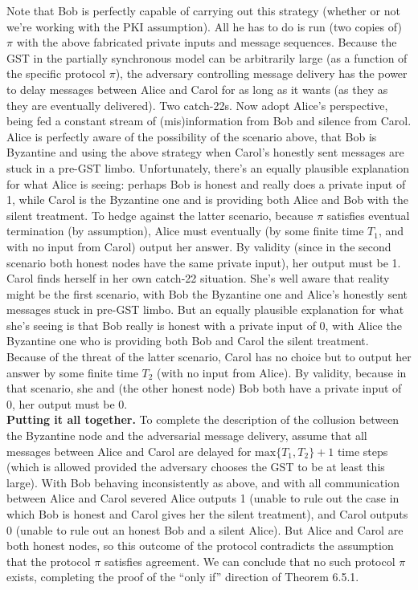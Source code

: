 Note that Bob is perfectly capable of carrying out this strategy (whether or not we’re working
with the PKI assumption). All he has to do is run (two copies of) $\pi$ with the above fabricated
private inputs and message sequences. Because the GST in the partially synchronous model
can be arbitrarily large (as a function of the specific protocol $\pi$), the adversary controlling
message delivery has the power to delay messages between Alice and Carol for as long as it
wants (as they as they are eventually delivered).
Two catch-22s. Now adopt Alice’s perspective, being fed a constant stream of (mis)information
from Bob and silence from Carol. Alice is perfectly aware of the possibility of the scenario
above, that Bob is Byzantine and using the above strategy when Carol’s honestly sent messages are stuck in a pre-GST limbo. Unfortunately, there’s an equally plausible explanation
for what Alice is seeing: perhaps Bob is honest and really does a private input of 1, while
Carol is the Byzantine one and is providing both Alice and Bob with the silent treatment. To hedge
against the latter scenario, because $\pi$ satisfies eventual termination (by assumption), Alice
must eventually (by some finite time $T_1$, and with no input from Carol) output her answer.
By validity (since in the second scenario both honest nodes have the same private input),
her output must be 1.
Carol finds herself in her own catch-22 situation. She’s well aware that reality might
be the first scenario, with Bob the Byzantine one and Alice’s honestly sent messages stuck
in pre-GST limbo. But an equally plausible explanation for what she’s seeing is that Bob
really is honest with a private input of 0, with Alice the Byzantine one who is providing both
Bob and Carol the silent treatment. Because of the threat of the latter scenario, Carol has
no choice but to output her answer by some finite time $T_2$ (with no input from Alice). By
validity, because in that scenario, she and (the other honest node) Bob both have a private
input of 0, her output must be 0.\\

\noindent
\textbf{Putting it all together.} To complete the description of the collusion between the Byzantine node and the adversarial message delivery, assume that all messages between Alice and
Carol are delayed for $\text{max}\{T_1, T_2\} + 1$ time steps (which is allowed provided the adversary
chooses the GST to be at least this large). With Bob behaving inconsistently as above, and
with all communication between Alice and Carol severed Alice outputs 1 (unable to rule out the case in which Bob is honest and Carol gives her the silent treatment), and Carol outputs 0 (unable to rule out an honest Bob and a silent Alice). But Alice and Carol are both
honest nodes, so this outcome of the protocol contradicts the assumption that the protocol $\pi$
satisfies agreement. We can conclude that no such protocol $\pi$ exists, completing the proof
of the “only if” direction of Theorem 6.5.1.

